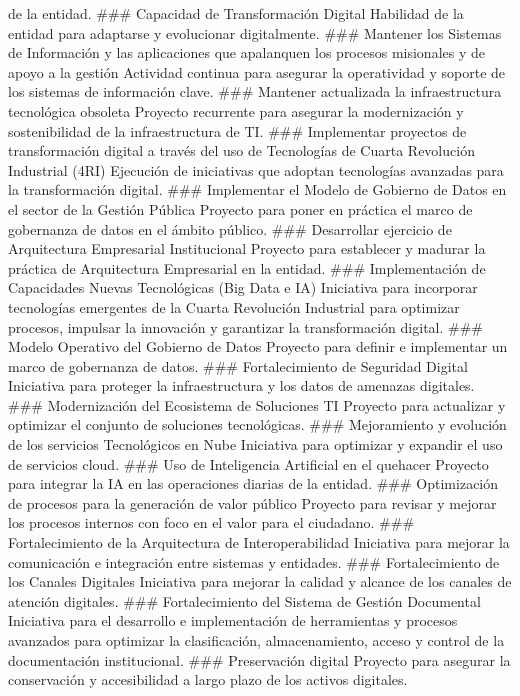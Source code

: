 \documentclass[
	a4paper, %
	12pt, %
]{include/CSSullivanBusinessReport}
\begin{document}
de la entidad. \#\#\# Capacidad de Transformación Digital Habilidad de
la entidad para adaptarse y evolucionar digitalmente. \#\#\# Mantener
los Sistemas de Información y las aplicaciones que apalanquen los
procesos misionales y de apoyo a la gestión Actividad continua para
asegurar la operatividad y soporte de los sistemas de información clave.
\#\#\# Mantener actualizada la infraestructura tecnológica obsoleta
Proyecto recurrente para asegurar la modernización y sostenibilidad de
la infraestructura de TI. \#\#\# Implementar proyectos de transformación
digital a través del uso de Tecnologías de Cuarta Revolución Industrial
(4RI) Ejecución de iniciativas que adoptan tecnologías avanzadas para la
transformación digital. \#\#\# Implementar el Modelo de Gobierno de
Datos en el sector de la Gestión Pública Proyecto para poner en práctica
el marco de gobernanza de datos en el ámbito público. \#\#\# Desarrollar
ejercicio de Arquitectura Empresarial Institucional Proyecto para
establecer y madurar la práctica de Arquitectura Empresarial en la
entidad. \#\#\# Implementación de Capacidades Nuevas Tecnológicas (Big
Data e IA) Iniciativa para incorporar tecnologías emergentes de la
Cuarta Revolución Industrial para optimizar procesos, impulsar la
innovación y garantizar la transformación digital. \#\#\# Modelo
Operativo del Gobierno de Datos Proyecto para definir e implementar un
marco de gobernanza de datos. \#\#\# Fortalecimiento de Seguridad
Digital Iniciativa para proteger la infraestructura y los datos de
amenazas digitales. \#\#\# Modernización del Ecosistema de Soluciones TI
Proyecto para actualizar y optimizar el conjunto de soluciones
tecnológicas. \#\#\# Mejoramiento y evolución de los servicios
Tecnológicos en Nube Iniciativa para optimizar y expandir el uso de
servicios cloud. \#\#\# Uso de Inteligencia Artificial en el quehacer
Proyecto para integrar la IA en las operaciones diarias de la entidad.
\#\#\# Optimización de procesos para la generación de valor público
Proyecto para revisar y mejorar los procesos internos con foco en el
valor para el ciudadano. \#\#\# Fortalecimiento de la Arquitectura de
Interoperabilidad Iniciativa para mejorar la comunicación e integración
entre sistemas y entidades. \#\#\# Fortalecimiento de los Canales
Digitales Iniciativa para mejorar la calidad y alcance de los canales de
atención digitales. \#\#\# Fortalecimiento del Sistema de Gestión
Documental Iniciativa para el desarrollo e implementación de
herramientas y procesos avanzados para optimizar la clasificación,
almacenamiento, acceso y control de la documentación institucional.
\#\#\# Preservación digital Proyecto para asegurar la conservación y
accesibilidad a largo plazo de los activos digitales.
\end{document}
